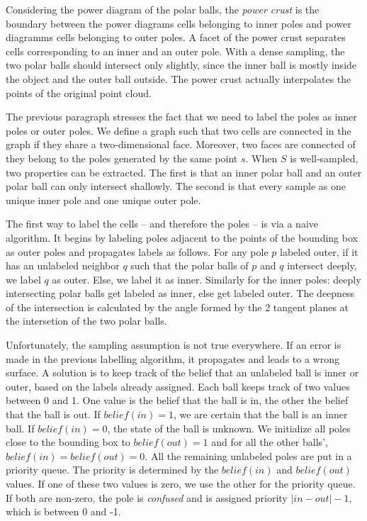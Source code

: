 \documentclass[12pt]{article}
\begin{document}
Considering the power diagram of the polar balls, the \textit{power crust} is the boundary between the power diagrams cells belonging to inner poles and power diagramms cells belonging to outer poles. A facet of the power crust separates cells corresponding to an inner and an outer pole. With a dense sampling, the two polar balls should intersect only slightly, since the inner ball is mostly inside the object and the outer ball outside. The power crust actually interpolates the points of the original point cloud.

The previous paragraph stresses the fact that we need to label the poles as inner poles or outer poles. We define a graph such that two cells are connected in the graph if they share a two-dimensional face. Moreover, two faces are connected of they belong to the poles generated by the same point $s$. When $S$ is well-sampled, two properties can be extracted. The first is that an inner polar ball and an outer polar ball can only intersect shallowly. The second is that every sample as one unique inner pole and one unique outer pole. 

The first way to label the cells -- and therefore the poles -- is via a naive algorithm. It begins by labeling poles adjacent to the points of the bounding box as outer poles and propagates labels as follows. For any pole $p$ labeled outer, if it has an unlabeled neighbor $q$ such that the polar balls of $p$ and $q$ intersect deeply, we label $q$ as outer. Else, we label it as inner. Similarly for the inner poles: deeply intersecting polar balls get labeled as inner, else get labeled outer. The deepness of the intersection is calculated by the angle formed by the 2 tangent planes at the intersetion of the two polar balls.

Unfortunately, the sampling assumption is not true everywhere. If an error is made in the previous labelling algorithm, it propagates and leads to a wrong surface. A solution is to keep track of the belief that an unlabeled ball is inner or outer, based on the labels already assigned. Each ball keeps track of two values between 0 and 1. One value is the belief that the ball is in, the other the belief that the ball is out. If $belief(in) = 1$, we are certain that the ball is an inner ball. If $belief(in) = 0$, the state of the ball is unknown. We initialize all poles close to the bounding box to $belief(out) = 1$ and for all the other balls', $belief(in) = belief(out) = 0$.
All the remaining unlabeled poles are put in a priority queue. The priority is determined by the $belief(in)$ and $belief(out)$ values. If one of these two values is zero, we use the other for the priority queue. If both are non-zero, the pole is \textit{confused} and is assigned priority $|in - out| - 1$, which is between 0 and -1.
\end{document}
